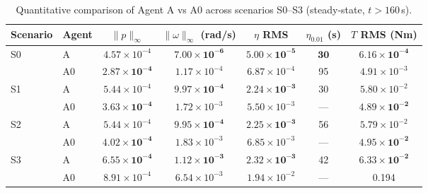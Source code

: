 \documentclass[a4paper,11pt]{article}
\begin{document}
\begin{table}[htbp]
\centering
\caption{Quantitative comparison of Agent A vs A0 across scenarios S0--S3 (steady-state, $t > 160$\,s).}
\label{tab:s0s3}
\begin{tabular}{llccccc}
\toprule
\textbf{Scenario} & \textbf{Agent} & \textbf{$\|p\|_\infty$} & \textbf{$\|\omega\|_\infty$ (rad/s)} & \textbf{$\eta$ RMS} & \textbf{$\eta_{0.01}$ (s)} & \textbf{$T$ RMS (Nm)} \\
\midrule
\multirow{2}{*}{S0} & A & $4.57\times10^{-4}$ & $\mathbf{7.00\times10^{-6}}$ & $\mathbf{5.00\times10^{-5}}$ & $\mathbf{30}$ & $\mathbf{6.16\times10^{-4}}$ \\
 & A0 & $\mathbf{2.87\times10^{-4}}$ & $1.17\times10^{-4}$ & $6.87\times10^{-4}$ & 95 & $4.91\times10^{-3}$ \\
\cmidrule(lr){1-7}
\multirow{2}{*}{S1} & A & $5.44\times10^{-4}$ & $\mathbf{9.97\times10^{-4}}$ & $\mathbf{2.24\times10^{-3}}$ & 30 & $5.80\times10^{-2}$ \\
 & A0 & $\mathbf{3.63\times10^{-4}}$ & $1.72\times10^{-3}$ & $5.50\times10^{-3}$ & --- & $\mathbf{4.89\times10^{-2}}$ \\
\cmidrule(lr){1-7}
\multirow{2}{*}{S2} & A & $5.44\times10^{-4}$ & $\mathbf{9.95\times10^{-4}}$ & $\mathbf{2.25\times10^{-3}}$ & 56 & $5.79\times10^{-2}$ \\
 & A0 & $\mathbf{4.02\times10^{-4}}$ & $1.83\times10^{-3}$ & $6.85\times10^{-3}$ & --- & $\mathbf{4.95\times10^{-2}}$ \\
\cmidrule(lr){1-7}
\multirow{2}{*}{S3} & A & $\mathbf{6.55\times10^{-4}}$ & $\mathbf{1.12\times10^{-3}}$ & $\mathbf{2.32\times10^{-3}}$ & 42 & $\mathbf{6.33\times10^{-2}}$ \\
 & A0 & $8.91\times10^{-4}$ & $6.54\times10^{-3}$ & $1.94\times10^{-2}$ & --- & 0.194 \\
\bottomrule
\end{tabular}
\end{table}
\end{document}
